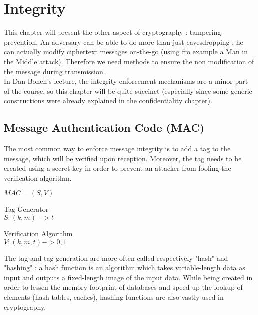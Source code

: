\chapter{Integrity}


This chapter will present the other aspect of cryptography : tampering prevention. An adversary can be able to do more than just eavesdropping : he can actually modify ciphertext messages on-the-go (using fro example a Man in the Middle attack). Therefore we need methods to ensure the non modification of the message during transmission.\\
In Dan Boneh's lecture, the integrity enforcement mechanisms are a minor part of the course, so this chapter will be quite succinct (especially since some generic constructions were already explained in the confidentiality chapter).


\section{Message Authentication Code (MAC)}

The most common way to enforce message integrity is to add a tag to the message, which will be verified upon reception. Moreover, the tag needs to be created using a secret key in order to prevent an attacker from fooling the verification algorithm.

\begin{mydef} $MAC = (S,V)$  
\begin{flushright}
	\begin{minipage}[t]{0.45\textwidth}
		\indent   	Tag Generator \\
		\indent      $S: (k,m) -> t$   \\
	\end{minipage}
	\begin{minipage}[t]{0.45\textwidth}
		\indent	Verification Algorithm \\
		\indent    $V: (k,m,t) -> {0,1}$ \\
	\end{minipage}
\end{flushright}
\end{mydef}

The tag and tag generation are more often called respectively "hash" and "hashing"  : a hash function is an algorithm which takes variable-length data as input and outputs a fixed-length image of the input data. While being created in order to lessen the memory footprint of databases and speed-up the lookup of elements (hash tables, caches), hashing functions are also vastly used in cryptography. 
 
